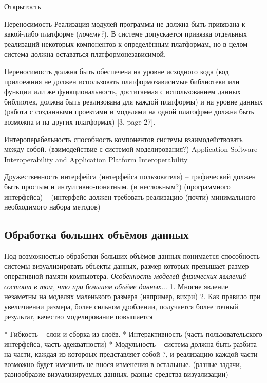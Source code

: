 \documentclass[a4paper,12pt]{extarticle}
\begin{document}
\begin{subsection}{Открытость}
    \begin{subsubsection}{Переносимость}
        Реализация модулей программы не должна быть привязана к какой-либо платформе (\textit{почему?}). В системе допускается привязка отдельных реализаций некоторых компонентов к определённым платформам, но в целом система должна оставаться платформонезависимой.
        
        Переносимость должна быть обеспечена на уровне исходного кода (код прилоежния не должен использовать платформозависимые библиотеки или функции или же функциональность, достигаемая с использованием данных библиотек, должна быть реализована для каждой платформы) и на уровне данных (работа с созданными проектами и моделями на одной платофрме должна быть возможна и на других платформах) [3, page 27].
    \end{subsubsection}
        
    \begin{subsubsection}{Интероперабельность}
        способность компонентов системы взаимодействовать между собой. (взимодействие с системой моделирования?)
        Application Software Interoperability and Application Platform Interoperability
    \end{subsubsection}
        
    \begin{subsubsection}{Дружественность интерфейса}
        (интерфейса пользователя) – графический должен быть простым и интуитивно-понятным. (и несложным?)
        (программного интерфейса) –  (интерфейс должен требовать реализацию (почти) минимального необходимого набора методов)
    \end{subsubsection}

\end{subsection}

\subsection{Обработка больших объёмов данных}
Под возможностью обработки больших объёмов данных понимается способность системы визуализировать объекты данных, размер которых превышает размер оперативной памяти компьютера. \textit{Особенность моделей физических являений состоит в том, что при большем объёме данных}... 
1. Многие явление незаметны на моделях маленького размера (например, вихри)
2. Как правило при увеличиении размера, более сильном дроблении, получается более точный результат, качество моделирование повышается

* Гибкость -- слои и сборка из слоёв.
* Интерактивность (часть пользовательского интерфейса, часть адекватности)
* Модульность -- система должна быть разбита на части, каждая из котороых представляет собой ?, и реализацию каждой части возможно будет имезнить не внося изменения в остальные. (разные задачи, разнообразие визуализируемых данных, разные средства визуализации)
\end{document}
